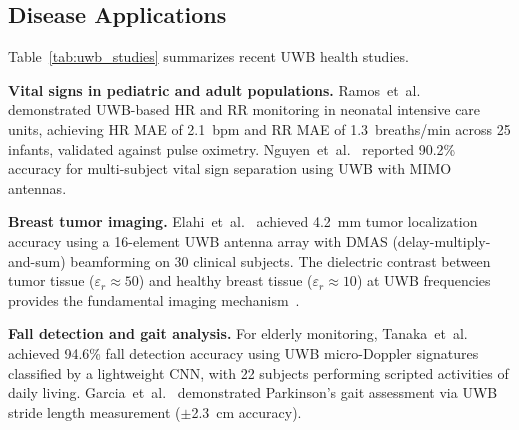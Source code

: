 \documentclass[journal,twoside]{IEEEtran}
\begin{document}
\subsection{Disease Applications}
Table~\ref{tab:uwb_studies} summarizes recent UWB health studies.

\textbf{Vital signs in pediatric and adult populations.} Ramos~et~al.~\cite{ref_ramos_uwb2024} demonstrated UWB-based HR and RR monitoring in neonatal intensive care units, achieving HR MAE of 2.1~bpm and RR MAE of 1.3~breaths/min across 25 infants, validated against pulse oximetry. Nguyen~et~al.~\cite{ref_nguyen_uwb2023} reported 90.2\% accuracy for multi-subject vital sign separation using UWB with MIMO antennas.

\textbf{Breast tumor imaging.} Elahi~et~al.~\cite{ref_elahi_uwb2024} achieved 4.2~mm tumor localization accuracy using a 16-element UWB antenna array with DMAS (delay-multiply-and-sum) beamforming on 30 clinical subjects. The dielectric contrast between tumor tissue ($\varepsilon_r \approx 50$) and healthy breast tissue ($\varepsilon_r \approx 10$) at UWB frequencies provides the fundamental imaging mechanism~\cite{ref_uwb_breast2025}.

\textbf{Fall detection and gait analysis.} For elderly monitoring, Tanaka~et~al.~\cite{ref_tanaka_fall2024} achieved 94.6\% fall detection accuracy using UWB micro-Doppler signatures classified by a lightweight CNN, with 22 subjects performing scripted activities of daily living. Garcia~et~al.~\cite{ref_garcia_gait2023} demonstrated Parkinson's gait assessment via UWB stride length measurement ($\pm$2.3~cm accuracy).
\end{document}
